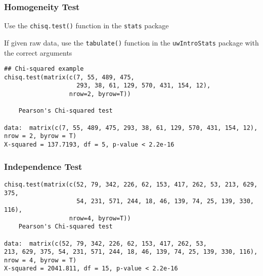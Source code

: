 \documentclass[pdf]{beamer}
\begin{document}
\begin{frame}[fragile]
\frametitle{Homogeneity Test}
Use the \texttt{chisq.test()} function in the \texttt{stats} package

If given raw data, use the \texttt{tabulate()} function in the \texttt{uwIntroStats} package with the correct arguments

{\fontsize{6pt}{7.2}\selectfont
\begin{verbatim}
## Chi-squared example
chisq.test(matrix(c(7, 55, 489, 475, 
                    293, 38, 61, 129, 570, 431, 154, 12), 
                  nrow=2, byrow=T))

	Pearson's Chi-squared test

data:  matrix(c(7, 55, 489, 475, 293, 38, 61, 129, 570, 431, 154, 12), nrow = 2, byrow = T)
X-squared = 137.7193, df = 5, p-value < 2.2e-16                  
\end{verbatim}}
\end{frame}

\begin{frame}[fragile]
\frametitle{Independence Test}
{\fontsize{6pt}{7.2}\selectfont

\begin{verbatim}
chisq.test(matrix(c(52, 79, 342, 226, 62, 153, 417, 262, 53, 213, 629, 375, 
                    54, 231, 571, 244, 18, 46, 139, 74, 25, 139, 330, 116), 
                  nrow=4, byrow=T))
	Pearson's Chi-squared test

data:  matrix(c(52, 79, 342, 226, 62, 153, 417, 262, 53, 
213, 629, 375, 54, 231, 571, 244, 18, 46, 139, 74, 25, 139, 330, 116), nrow = 4, byrow = T)
X-squared = 2041.811, df = 15, p-value < 2.2e-16
                  
\end{verbatim}}
\end{frame}
\end{document}
